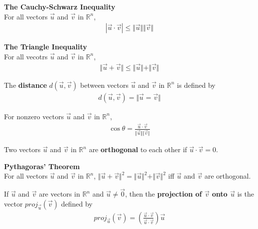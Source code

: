 \documentclass{article}
\begin{document}
\begin{theorem}
	\textbf{The Cauchy-Schwarz Inequality}\\
	For all vectors $\vec u$ and $\vec v$ in $\mathbb{R}^n$,
	\begin{gather*}
		|\vec u \cdot \vec v| \leq \Vert \vec u \Vert \Vert \vec v \Vert
	\end{gather*}
\end{theorem}
\begin{theorem}
	\textbf{The Triangle Inequality}\\
	For all vecotrs $\vec u$ and $\vec v$ in $\mathbb{R}^n$,
	\begin{gather*}
		\Vert \vec u + \vec v \Vert \leq \Vert \vec u \Vert + \Vert \vec v \Vert
	\end{gather*}
\end{theorem}
\begin{definition}
	The \textbf{distance} $d(\vec u, \vec v)$ between vectors $\vec u$ and $\vec v$ in $\mathbb{R}^n$ is defined by
	\begin{gather*}
		d(\vec u, \vec v) = \Vert \vec u = \vec v \Vert
	\end{gather*}
\end{definition}
\begin{definition}
	For nonzero vectors $\vec u$ and $\vec v$ in $\mathbb{R}^n$,
	\begin{gather*}
		\cos\theta = \frac{\vec u \cdot \vec v}{\Vert \vec u \Vert \Vert \vec v\Vert}
	\end{gather*}
\end{definition}
\begin{definition}
	Two vectors $\vec u$ and $\vec v$ in $\mathbb{R}^n$ are \textbf{orthogonal} to each other if $\vec u \cdot \vec v = 0$.
\end{definition}
\begin{theorem}
	\textbf{Pythagoras' Theorem}\\
	For all vectors $\vec u$ and $\vec v$ in $\mathbb{R}^n$, $\Vert \vec u + \vec v\Vert^2 = \Vert \vec u \Vert^2 + \Vert \vec v \Vert ^2$ iff $\vec u$ and $\vec v$ are orthogonal.
\end{theorem}
\begin{definition}
	If $\vec u$ and $\vec v$ are vectors in $\mathbb{R}^n$ and $\vec u \not= \vec 0$, then the \textbf{projection of $\vec v$ onto $\vec u$} is the vector $proj_{\vec u}(\vec v)$ defined by
	\begin{gather*}
		proj_{\vec u}(\vec v) = \left(\frac{\vec u \cdot \vec v}{\vec u \cdot \vec v}\right)\vec u
	\end{gather*}
\end{definition}
\end{document}
